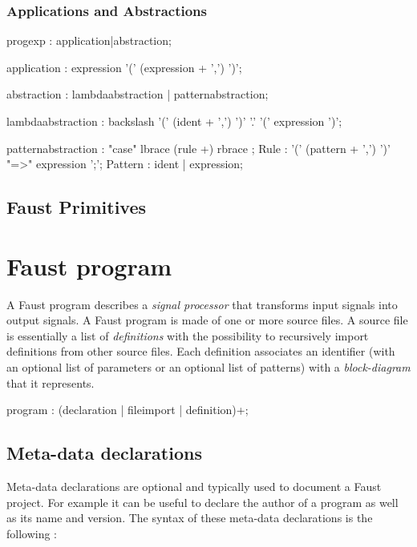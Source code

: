 \documentclass{article}
\begin{document}
\subsubsection{Applications and Abstractions}

\begin{rail}
progexp : application|abstraction;

application : expression '(' (expression + ',') ')';

abstraction : lambdaabstraction | patternabstraction; 

lambdaabstraction :  backslash '(' (ident + ',') ')' '.' '(' expression ')';
\end{rail}   

\begin{rail}
patternabstraction :  "case" lbrace (rule +) rbrace ;
Rule : '(' (pattern + ',') ')' "=>" expression ';';
Pattern : ident | expression;
\end{rail}

\subsection{Faust Primitives}



\section{Faust program} 


A Faust program describes a \emph{signal processor} that transforms input signals into output signals. A Faust program is made of one or more source files. A source file is essentially a list of \emph{definitions} with the possibility to recursively import definitions from other source files. Each definition associates an identifier (with an optional list of parameters or an optional list of patterns) with a \emph{block-diagram} that it represents.

\begin{rail}
program : (declaration | fileimport | definition)+;
\end{rail}

\subsection{Meta-data declarations}

Meta-data declarations are optional and typically used to document a Faust project. For example it can be useful to declare the author of a program as well as its name and version. The syntax of these meta-data declarations is the following :
\end{document}
